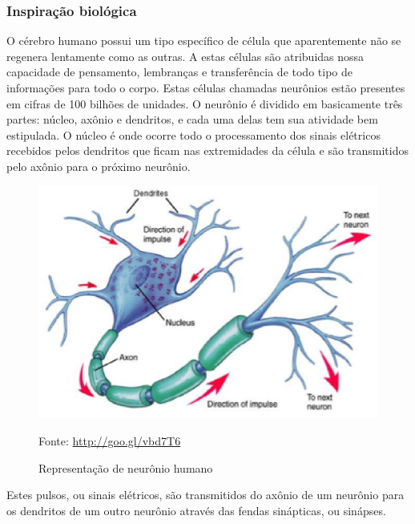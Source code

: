 \subsubsection{Inspiração biológica}

    O cérebro humano possui um tipo específico de célula que aparentemente não se regenera lentamente como as outras. A estas células são atribuidas nossa capacidade de pensamento, lembranças e transferência de todo tipo de informações para todo o corpo. Estas células chamadas neurônios estão presentes em cifras de 100 bilhões de unidades. \cite{anderson1992artificial}
    O neurônio é dividido em basicamente três partes: núcleo, axônio e dendritos, e cada uma delas tem sua atividade bem estipulada. O núcleo é onde ocorre todo o processamento dos sinais elétricos recebidos pelos dendritos que ficam nas extremidades da célula e são transmitidos pelo axônio para o próximo neurônio.

    \begin{figure}[ht]
        \centering
        \label{fig01}
            \includegraphics[keepaspectratio=true, scale=0.4]{editaveis/images/neuronio.eps}
        \caption{Representação de neurônio humano}
        Fonte: \url{http://goo.gl/vbd7T6}
    \end{figure}

    Estes pulsos, ou sinais elétricos, são transmitidos do axônio de um neurônio para os dendritos de um outro neurônio através das fendas sinápticas, ou sinápses.

